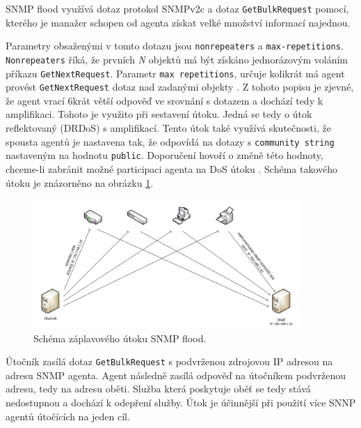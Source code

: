 SNMP flood využívá dotaz protokol SNMPv2c a dotaz \texttt{GetBulkRequest} pomocí, kterého je manažer schopen od agenta získat velké množství informací najednou.

Parametry obsaženými v tomto dotazu jsou \texttt{nonrepeaters} a \texttt{max-repetitions}. \texttt{Nonrepeaters} říká, že prvních \textit{N} objektů má být získáno jednorázovým voláním příkazu \texttt{GetNextRequest}. Parametr \texttt{max repetitions}, určuje kolikrát má agent provést \texttt{GetNextRequest} dotaz nad zadanými objekty \cite{Kukla2010}. Z tohoto popisu je zjevné, že agent vrací  6krát větší odpověď ve srovnání s dotazem a dochází tedy k amplifikaci. Tohoto je využito při sestavení útoku. Jedná se tedy o útok reflektovaný (DRDoS) s amplifikací. Tento útok také využívá skutečnosti, že spousta agentů je nastavena tak, že odpovídá na dotazy s \texttt{community string} nastaveným na hodnotu \texttt{public}. Doporučení hovoří o změně této hodnoty, chceme-li zabránit možné participaci agenta na DoS útoku \cite{Stange-snmp-amplification}. Schéma takového útoku je znázorněno na obrázku \ref{fig:snmp-flood-schema}.


\begin{figure}[!h]
	\begin{center}
		\includegraphics[width=0.9\textwidth]{obrazky/snmp_flood_schema.png}
	\end{center}
	\caption{Schéma záplavového útoku SNMP flood.}
	\label{fig:snmp-flood-schema}
\end{figure}

Útočník zasílá dotaz \texttt{GetBulkRequest} s podvrženou zdrojovou IP adresou na adresu SNMP agenta. Agent následně zasílá odpověď na útočníkem podvrženou adresu, tedy na adresu oběti. Služba která poskytuje oběť se tedy stává nedostupnou a dochází k odepření služby. 
Útok je účinnější při použití více SNNP agentů útočících na jeden cíl.

